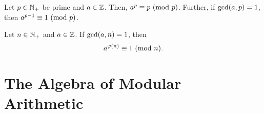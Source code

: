 \begin{theorem}
    Let $p \in \mathbb{N}_+$ be prime and $a \in \mathbb{Z}$.
    Then, $\modulo{a^p}{p}{p}$.
    Further, if $\gcd\pn*{a, p} = 1$, then $\modulo{a^{p - 1}}{1}{p}$.
\end{theorem}

\begin{theorem}
    Let $n \in \mathbb{N}_+$  and $a \in \mathbb{Z}$.
    If $\gcd\pn*{a, n} = 1$, then
    \[
        \modulo{a^{\varphi(n)}}{1}{n}.
    \]
\end{theorem}


\appendix

\chapter{The Algebra of Modular Arithmetic}

